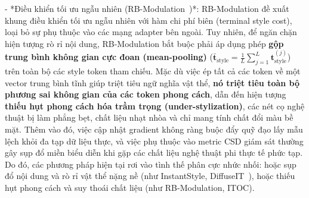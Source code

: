 \documentclass[runningheads]{llncs}
\begin{document}
- *Điều khiển tối ưu ngẫu nhiên (RB-Modulation~\cite{rout2025rbmodulation})*: RB-Modulation đề xuất khung điều khiển tối ưu ngẫu nhiên với hàm chi phí biên (terminal style cost), loại bỏ sự phụ thuộc vào các mạng adapter bên ngoài. Tuy nhiên, để ngăn chặn hiện tượng rò rỉ nội dung, RB-Modulation bắt buộc phải áp dụng phép \textbf{gộp trung bình không gian cực đoan (mean-pooling)} ($\bar{\mathbf{t}}_{\text{style}} = \frac{1}{L} \sum_{j=1}^L \mathbf{t}_{\text{style}}^{(j)}$) trên toàn bộ các style token tham chiếu. Mặc dù việc ép tất cả các token về một vector trung bình tĩnh giúp triệt tiêu ngữ nghĩa vật thể, \textbf{nó triệt tiêu toàn bộ phương sai không gian của các token phong cách}, dẫn đến hiện tượng \textbf{thiếu hụt phong cách hóa trầm trọng (under-stylization)}, các nét cọ nghệ thuật bị làm phẳng bẹt, chất liệu nhạt nhòa và chỉ mang tính chất đổi màu bề mặt. Thêm vào đó, việc cập nhật gradient không ràng buộc đẩy quỹ đạo lấy mẫu lệch khỏi đa tạp dữ liệu thực, và việc phụ thuộc vào metric CSD giám sát thường gây sụp đổ miền biểu diễn khi gặp các chất liệu nghệ thuật phi thực tế phức tạp. Do đó, các phương pháp hiện tại rơi vào tình thế phân cực nhức nhối: hoặc sụp đổ nội dung và rò rỉ vật thể nặng nề (như InstantStyle, DiffuseIT~\cite{diffuseIT}), hoặc thiếu hụt phong cách và suy thoái chất liệu (như RB-Modulation, ITOC).
\end{document}
